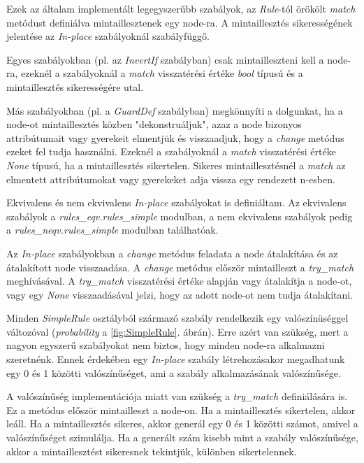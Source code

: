 Ezek az általam implementált legegyszerűbb szabályok,
az \emph{Rule}-tól örökölt \emph{match} metódust definiálva mintaillesztenek egy node-ra.
A mintaillesztés sikerességének jelentése az \emph{In-place} szabályoknál szabályfüggő.

Egyes szabályokban (pl. az \emph{InvertIf} szabályban) csak mintailleszteni kell a node-ra,
ezeknél a szabályoknál a \emph{match} visszatérési értéke \emph{bool} típusú
és a mintaillesztés sikerességére utal.

Más szabályokban (pl. a \emph{GuardDef} szabályban) megkönnyíti a dolgunkat,
ha a node-ot mintaillesztés közben "dekonstruáljuk", 
azaz a node bizonyos attribútumait vagy gyerekeit elmentjük és visszaadjuk,
hogy a \emph{change} metódus ezeket fel tudja használni.
Ezeknél a szabályoknál a \emph{match} visszatérési értéke \emph{None} típusú,
ha a mintaillesztés sikertelen.
Sikeres mintaillesztésnél a \emph{match} az elmentett attribútumokat vagy gyerekeket adja vissza
egy rendezett n-esben.

Ekvivalens és nem ekvivalens \emph{In-place} szabályokat is definiáltam.
Az ekvivalens szabályok
a \emph{rules\_eqv.rules\_simple} modulban,
a nem ekvivalens szabályok pedig
a \emph{rules\_neqv.rules\_simple} modulban
találhatóak.

Az \emph{In-place} szabályokban a \emph{change} metódus feladata a node átalakítása
és az átalakított node visszaadása.
A \emph{change} metódus először mintailleszt a \emph{try\_match} meghívásával.
A \emph{try\_match} visszatérési értéke alapján vagy átalakítja a node-ot,
vagy egy \emph{None} visszaadásával jelzi, hogy az adott node-ot nem tudja átalakítani.

Minden \emph{SimpleRule} osztályból származó szabály rendelkezik egy valószínüséggel változóval
(\emph{probability} a \ref{fig:SimpleRule}. ábrán).
Erre azért van szükség, mert a nagyon egyszerű szabályokat nem biztos,
hogy minden node-ra alkalmazni szeretnénk.
Ennek érdekében egy \emph{In-place} szabály létrehozásakor megadhatunk
egy 0 és 1 közötti valószínűséget, ami a szabály alkalmazásának valószínűsége.

A valószínűség implementációja miatt van szükség a \emph{try\_match} definiálására is.
Ez a metódus először mintailleszt a node-on.
Ha a mintaillesztés sikertelen, akkor leáll.
Ha a mintaillesztés sikeres,
akkor generál egy 0 és 1 közötti számot,
amivel a valószínűséget szimulálja.
Ha a generált szám kisebb mint a szabály valószínűsége,
akkor a mintaillesztést sikeresnek tekintjük, különben sikertelennek.

